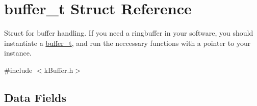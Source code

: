 \hypertarget{structbuffer__t}{}\section{buffer\+\_\+t Struct Reference}
\label{structbuffer__t}


Struct for buffer handling. If you need a ringbuffer in your software, you should instantiate a \hyperlink{structbuffer__t}{buffer\+\_\+t}, and run the neccessary functions with a pointer to your instance.  




{\ttfamily \#include $<$k\+Buffer.\+h$>$}

\subsection*{Data Fields}
